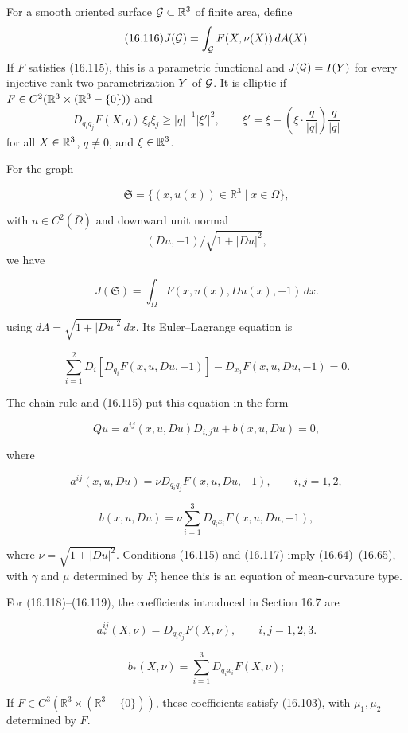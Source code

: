 \begin{definition}\label{gilbarg-trudinger.def.16.116.elliptic-parametric-functional}
For a smooth oriented surface $\mathcal{G}\subset\mathbb{R}^3$ of finite area, define
\begin{equation}
\tag{16.116}
J(\mathcal{G})=\int_{\mathcal{G}}F(X,\nu(X))\,dA(X).
\end{equation}
If $F$ satisfies (16.115), this is a parametric functional and
$J(\mathcal{G})=I(Y)$ for every injective rank-two parametrization $Y$ of $\mathcal{G}$.
It is elliptic if $F\in C^2(\mathbb{R}^3\times(\mathbb{R}^3-\{0\}))$ and
\begin{equation}
\tag{16.117}
D_{q_i q_j}F(X,q)\,\xi_i\xi_j\ge |q|^{-1}|\xi'|^2,\qquad
\xi'=\xi-\left(\xi\cdot\frac{q}{|q|}\right)\frac{q}{|q|}
\end{equation}
for all $X\in\mathbb{R}^3$, $q\ne0$, and $\xi\in\mathbb{R}^3$.
\end{definition}



For the graph

\[
\mathfrak{S}=\{(x,u(x))\in \mathbb{R}^{3}\mid x\in \Omega\},
\]

with $u\in C^2(\bar\Omega)$ and downward unit normal
\[
(Du,-1)/\sqrt{1+|Du|^{2}},
\]
we have

\[
J(\mathfrak{S})=\int_{\Omega}F(x,u(x),Du(x),-1)\,dx.
\]

using $dA=\sqrt{1+|Du|^2}\,dx$. Its Euler--Lagrange equation is

\[
\sum_{i=1}^{2}D_{i}[D_{q_{i}}F(x,u,Du,-1)]-D_{x_{3}}F(x,u,Du,-1)=0.
\]

The chain rule and (16.115) put this equation in the form

\[
Qu=a^{ij}(x,u,Du)D_{i,j}u+b(x,u,Du)=0,
\]

where

\begin{equation}
\tag{16.118}
a^{ij}(x,u,Du)=\nu D_{q_{i}q_{j}}F(x,u,Du,-1),\qquad i,j=1,2,
\end{equation}

\begin{equation}
\tag{16.119}
b(x,u,Du)=\nu\sum_{i=1}^{3}D_{q_{i}x_{i}}F(x,u,Du,-1),
\end{equation}

where $\nu=\sqrt{1+|Du|^2}$. Conditions (16.115) and (16.117) imply
(16.64)--(16.65), with $\gamma$ and $\mu$ determined by $F$; hence this is an
equation of mean-curvature type.

For (16.118)--(16.119), the coefficients introduced in Section 16.7 are

\[
a^{ij}_{*}(X,\nu)=D_{q_{i}q_{j}}F(X,\nu),\qquad i,j=1,2,3.
\]

\[
b_{*}(X,\nu)=\sum_{i=1}^{3}D_{q_{i}x_{i}}F(X,\nu);
\]

If $F\in C^3(\mathbb R^3\times(\mathbb R^3-\{0\}))$, these coefficients satisfy
(16.103), with $\mu_1,\mu_2$ determined by $F$.
